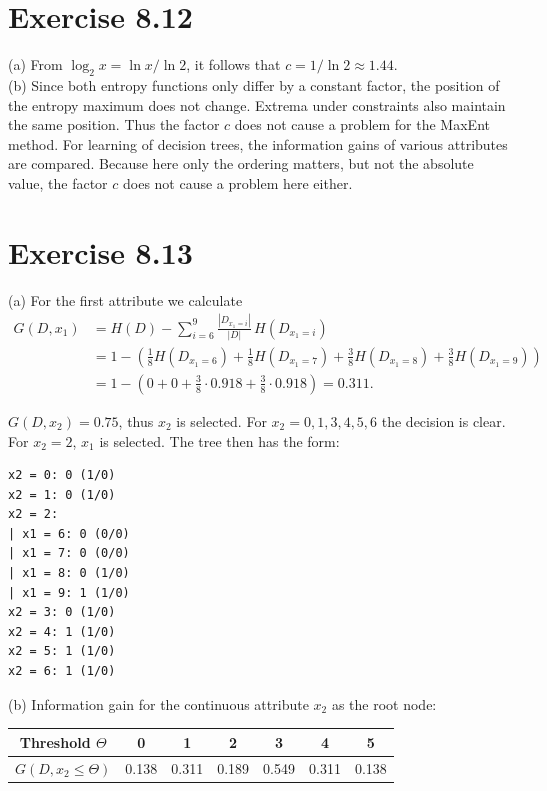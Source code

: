 \documentclass[10pt]{book}
\begin{document}
\section{Exercise 8.12}
(a) From $\log_{2} x = \ln x / \ln 2$, it follows that $c = 1 / \ln 2 \approx 1.44$.\\
(b) Since both entropy functions only differ by a constant factor, the position of the entropy maximum does not change. Extrema under constraints also maintain the same position. Thus the factor $c$ does not cause a problem for the MaxEnt method. For learning of decision trees, the information gains of various attributes are compared. Because here only the ordering matters, but not the absolute value, the factor $c$ does not cause a problem here either.

\section{Exercise 8.13}
(a) For the first attribute we calculate
\[
\begin{aligned}
G\left(D, x_{1}\right)
&= H(D) - \sum_{i=6}^{9} \frac{\left|D_{x_{1}=i}\right|}{|D|} \, H\left(D_{x_{1}=i}\right) \\
&= 1 - \left(\frac{1}{8} H\left(D_{x_{1}=6}\right) + \frac{1}{8} H\left(D_{x_{1}=7}\right) + \frac{3}{8} H\left(D_{x_{1}=8}\right) + \frac{3}{8} H\left(D_{x_{1}=9}\right)\right) \\
&= 1 - \left(0 + 0 + \frac{3}{8} \cdot 0.918 + \frac{3}{8} \cdot 0.918\right) = 0.311.
\end{aligned}
\]

$G\!\left(D, x_{2}\right) = 0.75$, thus $x_{2}$ is selected. For $x_{2} = 0, 1, 3, 4, 5, 6$ the decision is clear. For $x_{2} = 2$, $x_{1}$ is selected. The tree then has the form:
\begin{verbatim}
x2 = 0: 0 (1/0)
x2 = 1: 0 (1/0)
x2 = 2:
| x1 = 6: 0 (0/0)
| x1 = 7: 0 (0/0)
| x1 = 8: 0 (1/0)
| x1 = 9: 1 (1/0)
x2 = 3: 0 (1/0)
x2 = 4: 1 (1/0)
x2 = 5: 1 (1/0)
x2 = 6: 1 (1/0)
\end{verbatim}

(b) Information gain for the continuous attribute $x_{2}$ as the root node:

\begin{center}
\begin{tabular}{c|cccccc}
Threshold $\Theta$ & 0 & 1 & 2 & 3 & 4 & 5 \\
\hline
$G\!\left(D, x_{2} \le \Theta\right)$ & 0.138 & 0.311 & 0.189 & 0.549 & 0.311 & 0.138 \\
\end{tabular}
\end{center}
\end{document}
